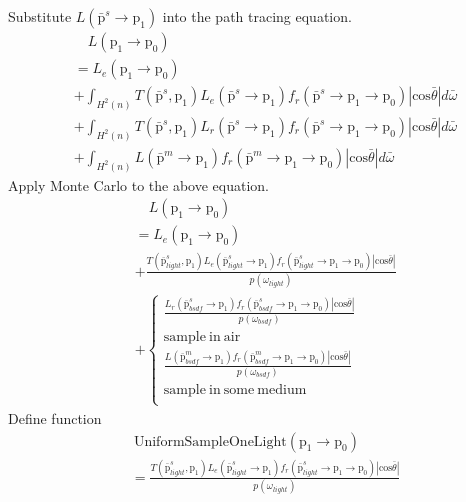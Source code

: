 \documentclass[acmtog]{acmart}
\def\w{\omega}
\def\p{\mathrm{p}}
\def\pp#1#2{\p_{#1}\rightarrow\p_{#2}}
\begin{document}
Substitute $L(\bar{\p}^s\rightarrow\p_1)$ into the path tracing equation.
\begin{equation} \label{eq7}
	\begin{split}
		&\quad L(\pp{1}{0})\\
		&= L_e(\pp{1}{0})\\
		&+ \int_{H^2(n)} T(\bar{\p}^s,\p_1)L_e(\bar{\p}^s\rightarrow\p_1) f_r(\bar{\p}^s\rightarrow\p_1\rightarrow\p_0)|\mathrm{cos}\bar{\theta}|d\bar{\w}\\
		&+ \int_{H^2(n)} T(\bar{\p}^s,\p_1)L_r(\bar{\p}^s\rightarrow\p_1) f_r(\bar{\p}^s\rightarrow\p_1\rightarrow\p_0)|\mathrm{cos}\bar{\theta}|d\bar{\w}\\
		&+ \int_{H^2(n)} L(\bar{\p}^m\rightarrow\p_1) f_r(\bar{\p}^m\rightarrow\p_1\rightarrow\p_0)|\mathrm{cos}\bar{\theta}|d\bar{\w}
	\end{split}
\end{equation}
Apply Monte Carlo to the above equation.
\begin{equation} \label{eq8}
	\begin{split}
		&\quad L(\pp{1}{0})\\
		&= L_e(\pp{1}{0})\\
		&+ \frac{T(\bar{\p}^s_{light},\p_1)L_e(\bar{\p}^s_{light}\rightarrow\p_1) f_r(\bar{\p}^s_{light}\rightarrow\p_1\rightarrow\p_0)|\mathrm{cos}\bar{\theta}|}{p(\w_{light})}\\
		&+
		\left\{\begin{aligned}
			\frac{L_r(\bar{\p}^s_{bsdf}\rightarrow\p_1)f_r(\bar{\p}^s_{bsdf}\rightarrow\p_1\rightarrow\p_0)|\mathrm{cos}\bar{\theta}|}{p(\w_{bsdf})}\\
			\mathrm{sample\ in\ air}\\
			\frac{L(\bar{\p}^m_{bsdf}\rightarrow\p_1) f_r(\bar{\p}^m_{bsdf}\rightarrow\p_1\rightarrow\p_0)|\mathrm{cos}\bar{\theta}|}{p(\w_{bsdf})}\ \ \\
			\mathrm{sample\ in\ some\ medium}\\
		\end{aligned}\right.
	\end{split}
\end{equation}
Define function
\begin{equation} \label{eq9}
	\begin{split}
		&\ \mathrm{UniformSampleOneLight}(\pp{1}{0})\\
		&= \frac{T(\bar{\p}^s_{light},\p_1)L_e(\bar{\p}^s_{light}\rightarrow\p_1) f_r(\bar{\p}^s_{light}\rightarrow\p_1\rightarrow\p_0)|\mathrm{cos}\bar{\theta}|}{p(\w_{light})}
	\end{split}
\end{equation}
\end{document}
